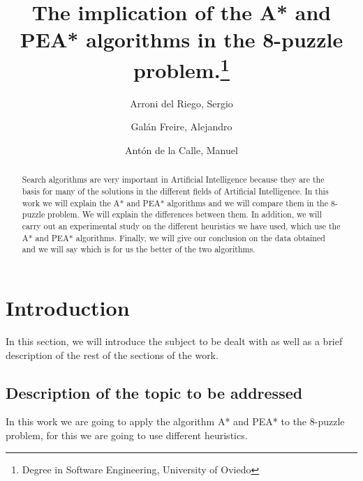 \documentclass[runningheads]{llncs}
\begin{document}
%
\title{The implication of the A* and PEA* algorithms in the 8-puzzle problem.\thanks{Degree in Software Engineering, University of Oviedo}}
%
%
\author{Arroni del Riego, Sergio \and
Galán Freire, Alejandro \and
Antón de la Calle, Manuel }
%
%
%
\maketitle             %
%
\begin{abstract}
    Search algorithms are very important in Artificial Intelligence because they are the basis for many of the solutions in the different fields of Artificial Intelligence. In this work we will explain the A* and PEA* algorithms and we will compare them in the 8-puzzle problem. We will explain the differences between them.
    In addition, we will carry out an experimental study on the different heuristics we have used, which use the A* and PEA* algorithms. Finally, we will give our conclusion on the data obtained and we will say which is for us the better of the two algorithms. 

\end{abstract}
%
%
%
\section{Introduction}
In this section, we will introduce the subject to be dealt with as well 
as a brief description of the rest of the sections of the work.

\subsection{Description of the topic to be addressed}
In this work we are going to apply the algorithm A* and PEA* to the 8-puzzle problem, 
for this we are going to use different heuristics.
\end{document}
